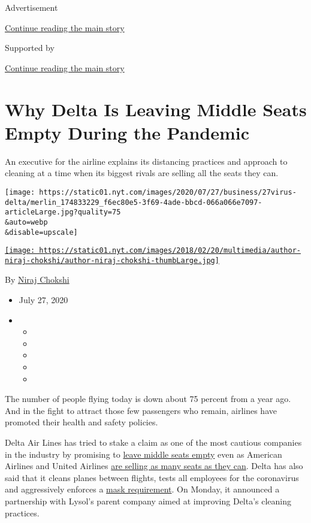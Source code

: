 Advertisement

\protect\hyperlink{after-top}{Continue reading the main story}

Supported by

\protect\hyperlink{after-sponsor}{Continue reading the main story}

\hypertarget{why-delta-is-leaving-middle-seats-empty-during-the-pandemic}{%
\section{Why Delta Is Leaving Middle Seats Empty During the
Pandemic}\label{why-delta-is-leaving-middle-seats-empty-during-the-pandemic}}

An executive for the airline explains its distancing practices and
approach to cleaning at a time when its biggest rivals are selling all
the seats they can.

\texttt{[image: https://static01.nyt.com/images/2020/07/27/business/27virus-delta/merlin\_174833229\_f6ec80e5-3f69-4ade-bbcd-066a066e7097-articleLarge.jpg?quality=75\\\&auto=webp\\\&disable=upscale]}

\href{https://www.nytimes.com/by/niraj-chokshi}{\texttt{[image: https://static01.nyt.com/images/2018/02/20/multimedia/author-niraj-chokshi/author-niraj-chokshi-thumbLarge.jpg]}}

By \href{https://www.nytimes.com/by/niraj-chokshi}{Niraj Chokshi}

\begin{itemize}
\item
  July 27, 2020
\item
  \begin{itemize}
  \item
  \item
  \item
  \item
  \item
  \end{itemize}
\end{itemize}

The number of people flying today is down about 75 percent from a year
ago. And in the fight to attract those few passengers who remain,
airlines have promoted their health and safety policies.

Delta Air Lines has tried to stake a claim as one of the most cautious
companies in the industry by promising to
\href{https://www.nytimes.com/2020/07/08/travel/airplanes-social-distancing-coronavirus.html}{leave
middle seats empty} even as American Airlines and United Airlines
\href{https://www.nytimes.com/2020/07/21/travel/crowded-flights-coronavirus.html}{are
selling as many seats as they can}. Delta has also said that it cleans
planes between flights, tests all employees for the coronavirus and
aggressively enforces a
\href{https://www.nytimes.com/2020/06/18/us/american-airlines-mask-brandon-straka.html}{mask
requirement}. On Monday, it announced a partnership with Lysol's parent
company aimed at improving Delta's cleaning practices.

